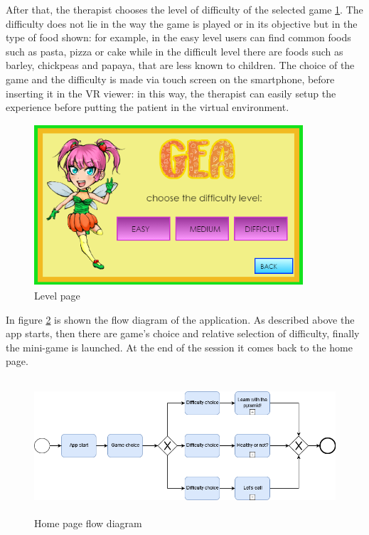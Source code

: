 After that, the therapist chooses the level of difficulty of the selected game \ref{fig:level}. The difficulty does not lie in the way the game is played or in its objective but in the type of food shown: for example, in the easy level users can find common foods such as pasta, pizza or cake while in the difficult level there are foods such as barley, chickpeas and papaya, that are less known to children. The choice of the game and the difficulty is made via touch screen on the smartphone, before inserting it in the VR viewer: in this way, the therapist can easily setup the experience before putting the patient in the virtual environment.\\
\begin{figure}[H]
\centering
\includegraphics[width=10cm, height=6cm]{immagini/Level.png}
\caption{Level page}\label{fig:level}
\end{figure}
In figure \ref{fig:homeflow} is shown the flow diagram of the application. As described above the app starts, then there are game's choice and relative selection of difficulty, finally the mini-game is launched. At the end of the session it comes back to the home page.\\
\begin{figure}[H]
\centering
\includegraphics[width=15cm, height=5cm]{immagini/flow1.png}
\caption{Home page flow diagram}\label{fig:homeflow}
\end{figure}
